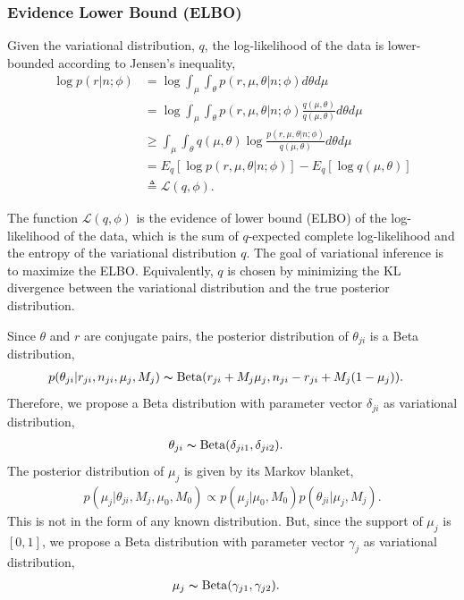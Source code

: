 \documentclass{bmcart}
\begin{document}
\subsubsection{Evidence Lower Bound (ELBO)}
Given the variational distribution, $q$, the log-likelihood of the data is lower-bounded according to Jensen's inequality,
\begin{equation}
\begin{split}
\log p \left( r | n; \phi \right) &= \log \int_\mu \int_\theta p\left(r,\mu,\theta |n; \phi \right) d\theta d\mu \\
&= \log \int_\mu \int_\theta p\left(r,\mu,\theta |n; \phi \right)\frac{q\left(\mu,\theta \right) }{q\left(\mu,\theta \right) } d\theta d\mu \\
&\geq \int_\mu \int_\theta q\left(\mu,\theta \right) \log \frac{ p\left(r,\mu,\theta |n; \phi \right)}{q\left(\mu,\theta \right)} d\theta d\mu \\
&= E_q \left[ \log p\left(r,\mu,\theta |n; \phi \right)\right] - E_q \left[ \log q\left(\mu,\theta \right)\right] \\
&\triangleq \mathcal{L}(q, \phi).
\end{split}
\end{equation}

The function $\mathcal{L}(q, \phi)$ is the evidence of lower bound (ELBO) of the log-likelihood of the data, which is the sum of $q$-expected complete log-likelihood and the entropy of the variational distribution $q$.
The goal of variational inference is to maximize the ELBO.
Equivalently, $q$ is chosen by minimizing the KL divergence between the variational distribution and the true posterior distribution.

Since $\theta$ and $r$ are conjugate pairs, the posterior distribution of $\theta_{ji}$ is a Beta distribution,
\begin{align}
&p(\theta_{ji}|r_{ji},n_{ji},\mu_j,M_j)
\thicksim \text{Beta}(r_{ji}+M_j \mu_j, n_{ji}-r_{ji}+M_j(1-\mu_j)).
\end{align}
Therefore, we propose a Beta distribution with parameter vector $\delta_{ji}$ as variational distribution,
\begin{align}
\theta_{ji} &\thicksim \text{Beta}(\delta_{ji1}, \delta_{ji2}) \nonumber.
\end{align}
%
The posterior distribution of $\mu_j$ is given by its Markov blanket,
\begin{align}
p(\mu_j|\theta_{ji},M_j,\mu_0,M_0)\propto p(\mu_j|\mu_0,M_0)p(\theta_{ji}|\mu_j,M_j).
\end{align}
This is not in the form of any known distribution.
But, since the support of $\mu_j$ is $[0,1]$, we propose a Beta distribution with parameter vector $\gamma_{j}$ as variational distribution,
\begin{align}
\mu_j &\thicksim \text{Beta}(\gamma_{j1}, \gamma_{j2}) \nonumber.
\end{align}
\end{document}
